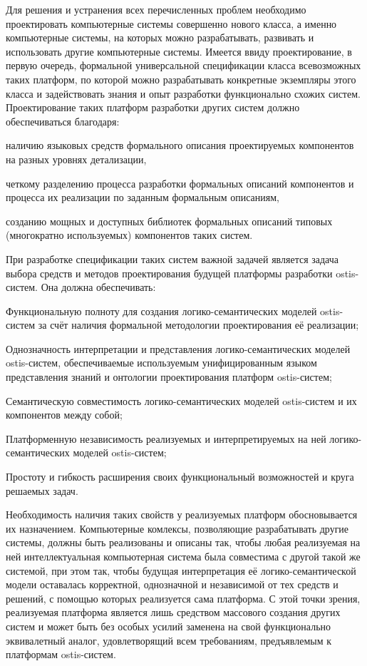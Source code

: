 Для решения и устранения всех перечисленных проблем необходимо проектировать компьютерные системы совершенно нового
класса, а именно компьютерные системы, на которых можно разрабатывать, развивать и использовать другие компьютерные
системы. Имеется ввиду проектирование, в первую очередь, формальной универсальной спецификации класса всевозможных таких
платформ, по которой можно разрабатывать конкретные экземпляры этого класса и задействовать знания и опыт разработки
функционально схожих систем. Проектирование таких платформ разработки других систем должно обеспечиваться благодаря:
\begin{scnitemize}
    \item наличию языковых средств формального описания проектируемых компонентов на разных уровнях детализации,
    \item четкому разделению процесса разработки формальных описаний компонентов и процесса их реализации по заданным
    формальным описаниям,
    \item созданию мощных и доступных библиотек формальных описаний типовых (многократно используемых) компонентов
    таких систем.
\end{scnitemize}

При разработке спецификации таких систем важной задачей является задача выбора средств и методов проектирования
будущей платформы разработки ostis-систем. Она должна обеспечивать:
\begin{scnitemize}
    \item Функциональную полноту для создания логико-семантических моделей ostis-систем за счёт наличия формальной
    методологии проектирования её реализации;
    \item Однозначность интерпретации и представления логико-семантических моделей ostis-систем, обеспечиваемые
    используемым
    унифицированным языком представления знаний и онтологии проектирования платформ ostis-систем;
    \item Семантическую совместимость логико-семантических моделей ostis-систем и их компонентов между собой;
    \item Платформенную независимость реализуемых и интерпретируемых на ней логико-семантических моделей ostis-систем;
    \item Простоту и гибкость расширения своих функциональный возможностей и круга решаемых задач.
\end{scnitemize}

Необходимость наличия таких свойств у реализуемых платформ обосновывается их назначением. Компьютерные комлексы,
позволяющие разрабатывать другие системы, должны быть реализованы и описаны так, чтобы любая реализуемая на ней
интеллектуальная компьютерная система была совместима с другой такой же системой, при этом так, чтобы будущая
интерпретация её логико-семантической модели оставалась корректной, однозначной и независимой от тех средств и
решений, с помощью которых реализуется сама платформа. С этой точки зрения, реализуемая платформа является лишь средством
массового создания других систем и может быть без особых усилий заменена на свой функционально эквивалетный аналог,
удовлетворящий всем требованиям, предъявлемым к платформам ostis-систем.

